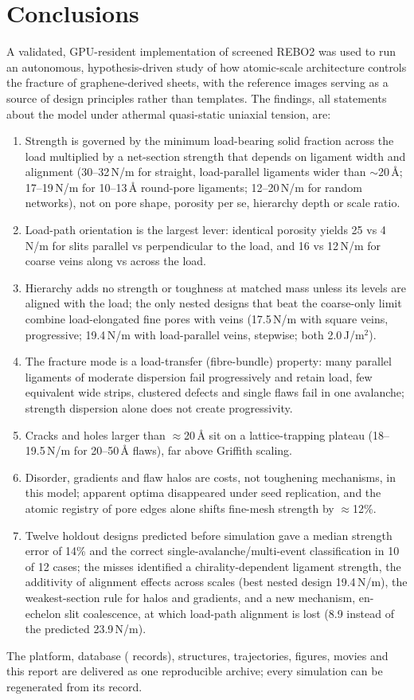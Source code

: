 \section{Conclusions}
A validated, GPU-resident implementation of screened REBO2 was used to run an autonomous, hypothesis-driven study of how atomic-scale architecture controls the fracture of graphene-derived sheets, with the reference images serving as a source of design principles rather than templates. The findings, all statements about the \rebo{} model under athermal quasi-static uniaxial tension, are:
\begin{enumerate}
\item Strength is governed by the minimum load-bearing solid fraction across the load multiplied by a net-section strength that depends on ligament width and alignment (30--32\,N/m for straight, load-parallel ligaments wider than $\sim$20\,\AA; 17--19\,N/m for 10--13\,\AA{} round-pore ligaments; 12--20\,N/m for random networks), not on pore shape, porosity per se, hierarchy depth or scale ratio.
\item Load-path orientation is the largest lever: identical porosity yields 25 vs 4\,N/m for slits parallel vs perpendicular to the load, and 16 vs 12\,N/m for coarse veins along vs across the load.
\item Hierarchy adds no strength or toughness at matched mass unless its levels are aligned with the load; the only nested designs that beat the coarse-only limit combine load-elongated fine pores with veins (17.5\,N/m with square veins, progressive; 19.4\,N/m with load-parallel veins, stepwise; both 2.0\,J/m$^2$).
\item The fracture mode is a load-transfer (fibre-bundle) property: many parallel ligaments of moderate dispersion fail progressively and retain load, few equivalent wide strips, clustered defects and single flaws fail in one avalanche; strength dispersion alone does not create progressivity.
\item Cracks and holes larger than $\approx$20\,\AA{} sit on a lattice-trapping plateau (18--19.5\,N/m for 20--50\,\AA{} flaws), far above Griffith scaling.
\item Disorder, gradients and flaw halos are costs, not toughening mechanisms, in this model; apparent optima disappeared under seed replication, and the atomic registry of pore edges alone shifts fine-mesh strength by $\approx$12\%.
\item Twelve holdout designs predicted before simulation gave a median strength error of 14\% and the correct single-avalanche/multi-event classification in 10 of 12 cases; the misses identified a chirality-dependent ligament strength, the additivity of alignment effects across scales (best nested design 19.4\,N/m), the weakest-section rule for halos and gradients, and a new mechanism, en-echelon slit coalescence, at which load-path alignment is lost (8.9 instead of the predicted 23.9\,N/m).
\end{enumerate}
The platform, database (\nRuns{} records), structures, trajectories, figures, movies and this report are delivered as one reproducible archive; every simulation can be regenerated from its record.

